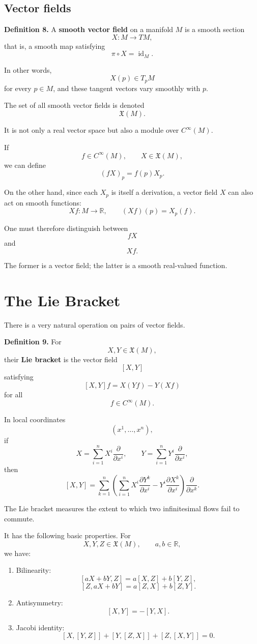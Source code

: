 \documentclass[11pt]{article}
\begin{document}
\subsection{Vector fields}

\textbf{Definition 8.}
A \textbf{smooth vector field} on a manifold $M$ is a smooth section
\[
X:M\to TM,
\]
that is, a smooth map satisfying
\[
\pi\circ X=\operatorname{id}_M.
\]

In other words,
\[
X(p)\in T_pM
\]
for every $p\in M$, and these tangent vectors vary smoothly with $p$.

The set of all smooth vector fields is denoted
\[
\mathfrak{X}(M).
\]

It is not only a real vector space but also a module over $C^\infty(M)$.

If
\[
f\in C^\infty(M),
\qquad
X\in\mathfrak{X}(M),
\]
we can define
\[
(fX)_p=f(p)X_p.
\]

On the other hand, since each $X_p$ is itself a derivation, a vector field $X$ can also act on smooth functions:
\[
Xf:M\to\mathbb{R},
\qquad
(Xf)(p)=X_p(f).
\]

One must therefore distinguish between
\[
fX
\]
and
\[
Xf.
\]

The former is a vector field; the latter is a smooth real-valued function.


\section{The Lie Bracket}

There is a very natural operation on pairs of vector fields.

\textbf{Definition 9.}
For
\[
X,Y\in\mathfrak{X}(M),
\]
their \textbf{Lie bracket} is the vector field
\[
[X,Y]
\]
satisfying
\[
[X,Y]f
=
X(Yf)-Y(Xf)
\]
for all
\[
f\in C^\infty(M).
\]

In local coordinates
\[
(x^1,\ldots,x^n),
\]
if
\[
X
=
\sum_{i=1}^{n}
X^i\frac{\partial}{\partial x^i},
\qquad
Y
=
\sum_{i=1}^{n}
Y^i\frac{\partial}{\partial x^i},
\]
then
\[
[X,Y]
=
\sum_{k=1}^{n}
\left(
\sum_{i=1}^{n}
X^i\frac{\partial Y^k}{\partial x^i}
-
Y^i\frac{\partial X^k}{\partial x^i}
\right)
\frac{\partial}{\partial x^k}.
\]

The Lie bracket measures the extent to which two infinitesimal flows fail to commute.

It has the following basic properties. For
\[
X,Y,Z\in\mathfrak{X}(M),
\qquad
a,b\in\mathbb{R},
\]
we have:

\begin{enumerate}
    \item Bilinearity:
    \[
    [aX+bY,Z]
    =
    a[X,Z]+b[Y,Z],
    \]
    \[
    [Z,aX+bY]
    =
    a[Z,X]+b[Z,Y].
    \]

    \item Antisymmetry:
    \[
    [X,Y]=-[Y,X].
    \]

    \item Jacobi identity:
    \[
    [X,[Y,Z]]
    +
    [Y,[Z,X]]
    +
    [Z,[X,Y]]
    =
    0.
    \]
\end{enumerate}
\end{document}

